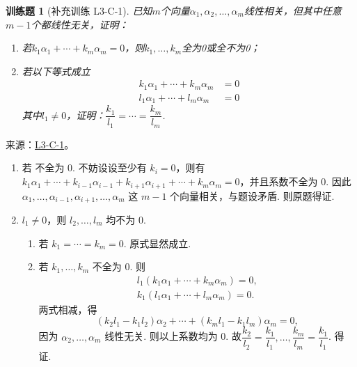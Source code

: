 \documentclass[12pt,fontset=fandol]{ctexart}
\newtheorem{exercise}{训练题}[section]
\begin{document}
\begin{exercise}[补充训练 L3-C-1]\label{prob:L3-C-1}
已知$m$个向量$\alpha_1,\alpha_2,\ldots,\alpha_m$线性相关，但其中任意$m-1$个都线性无关，证明：
        \begin{enumerate}
            \item 若$k_1\alpha_1+\cdots+k_m\alpha_m=0$，则$k_1,\ldots,k_m$全为0或全不为0；

            \item 若以下等式成立
                  \begin{align*}
                      k_1\alpha_1+\cdots+k_m\alpha_m & =0 \\
                      l_1\alpha_1+\cdots+l_m\alpha_m & =0
                  \end{align*}
                  其中$l_1\neq 0$，证明：$\dfrac{k_1}{l_1}=\cdots=\dfrac{k_m}{l_m}$.
        \end{enumerate}
\end{exercise}
\noindent 来源：\href{https://github.com/yhwu-is/Linear-Algebra-Left-Undone/blob/new/%E8%AE%B2%E4%B9%89/%E4%B8%93%E9%A2%98/3%20%E6%9C%89%E9%99%90%E7%BB%B4%E7%BA%BF%E6%80%A7%E7%A9%BA%E9%97%B4.tex}{L3-C-1}。
\begin{solve}
\begin{enumerate}
                \item 若 不全为 0. 不妨设设至少有 $k_i=0$，则有 $k_1\alpha_1+\cdots+k_{i-1}\alpha_{i-1}+k_{i+1}\alpha_{i+1}+\cdots+k_m\alpha_m=0$，并且系数不全为 0. 因此 $\alpha_1,\ldots,\alpha_{i-1},\alpha_{i+1},\ldots,\alpha_m$ 这 $m-1$ 个向量相关，与题设矛盾. 则原题得证.

                \item $l_1\neq 0$，则 $l_2,\ldots,l_m$ 均不为 0.
                      \begin{enumerate}
                          \item 若 $k_1=\cdots=k_m=0$. 原式显然成立.

                          \item 若 $k_1,\ldots,k_m$ 不全为 0. 则
                                \begin{gather*}
                                    l_1(k_1\alpha_1+\cdots+k_m\alpha_m)=0, \\
                                    k_1(l_1\alpha_1+\cdots+l_m\alpha_m)=0.
                                \end{gather*}
                                两式相减，得
                                \[(k_2l_1-k_1l_2)\alpha_2+\cdots+(k_ml_1-k_1l_m)\alpha_m=0,\]
                                因为 $\alpha_2,\ldots,\alpha_m$ 线性无关. 则以上系数均为 0. 故$\dfrac {k_2}{l_2}=\dfrac {k_1}{l_1},\ldots,\dfrac {k_m}{l_m}=\dfrac {k_1}{l_1}$. 得证.
                      \end{enumerate}
            \end{enumerate}
\end{solve}
\end{document}
